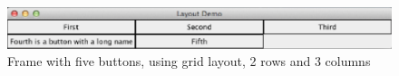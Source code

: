 


\begin {figure}

\includegraphics{figs/ch10/grid.eps}

\caption {Frame with five buttons, using grid layout, 2 rows and 
3 columns}

\label {fig:grid}

\end {figure}

